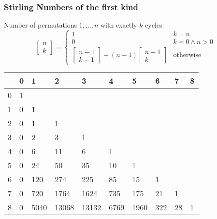 \subsubsection{Stirling Numbers of the first kind}
Number of permutations $1, \dots, n$ with exactly $k$ cycles.
\begin{equation*}
  \begin{bmatrix}
    n\\k
  \end{bmatrix} =
  \begin{cases}
  	1 & k = n \\
    0 & k = 0 \land n > 0\\
    \left[
      \begin{smallmatrix}
        n - 1\\k - 1
      \end{smallmatrix}
\right] + (n - 1) \left[
  \begin{smallmatrix}
    n-1\\k
  \end{smallmatrix}
\right] & \text{otherwise}
  \end{cases}
\end{equation*}

\begin{center}
	\begin{tabular}{ |l||l|l|l|l|l|l|l|l|l |} 
		\hline
		\diagbox{$n$}{$k$} & 0 & 1 & 2 & 3 & 4 & 5 & 6 & 7 & 8  \\
		\hline\hline
		0 & 1 &        &       &      &        &     &    &     & \\
		1 & 0 &  1    &       &       &      &      &     &     &  \\
		2 & 0 &  1    & 1     &       &      &      &     &     &  \\
		3 & 0 &  2    & 3     & 1     &      &      &     &     &  \\
		4 & 0 &  6    & 11    & 6     & 1    &      &     &     &  \\
		5 &  0 & 24   & 50    & 35    & 10   & 1    &     &     &  \\
		6 & 0 &  120  & 274   & 225   & 85   & 15   & 1   &     &  \\
		7 & 0 &  720  & 1764  & 1624  & 735  & 175  & 21  & 1   &  \\
		8 & 0 &  5040 & 13068 & 13132 & 6769 & 1960 & 322 & 28 & 1 \\
		\hline
	\end{tabular}
\end{center}

